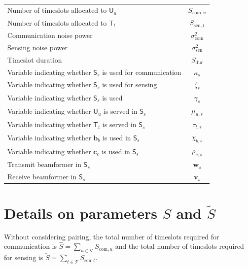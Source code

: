 \documentclass[10pt,journal,compsoc]{IEEEtran}
\theoremstyle{myremark}
\theoremstyle{myexample}
\begin{document}
\begin{appendices}
\begin{table}[H]
\begin{tabular}{|m{6.7cm} |c|}
		Number of timeslots allocated to $ \mathsf{U}_u $			& $ S_{\mathrm{com},u} $ \\
		Number of timeslots allocated to $ \mathsf{T}_t $			& $ S_{\mathrm{sen},t} $ \\
		Communication noise power 							& $ \sigma^2_\mathrm{com} $ \\ 
		Sensing noise power 								& $ \sigma^2_\mathrm{sen} $ \\ 
		Timeslot duration 								& $ S_\mathrm{dur} $ \\ 
		\hline
		Variable indicating whether $ \mathsf{S}_s $ is used for communication & $ \kappa_s $ \\
		Variable indicating whether $ \mathsf{S}_s $ is used for sensing & $ \zeta_s $ \\
		Variable indicating whether $ \mathsf{S}_s $ is used & $ \gamma_s $ \\
		Variable indicating whether $ \mathsf{U}_u $	is served in $ \mathsf{S}_s $ & $ \mu_{u,s} $ \\
		Variable indicating whether $ \mathsf{T}_t $	is served in $ \mathsf{S}_s $ & $ \tau_{t,s} $ \\
		Variable indicating whether $ \textbf{b}_b $ is used in $ \mathsf{S}_s $ & $ \chi_{b,s} $ \\
		Variable indicating whether $ \textbf{c}_c $ is used in $ \mathsf{S}_s $ & $ \rho_{c,s} $ \\
		Transmit beamformer in $ \mathsf{S}_s $			& $ \mathbf{w}_s $ \\
		Receive beamformer in $ \mathsf{S}_s $				& $ \mathbf{v}_s $ \\
		\hline
	\end{tabular}
	\label{tab:parameters-variables}
\end{table}



\setcounter{equation}{0}
\setcounter{table}{0}
\renewcommand{\theequation}{C.\arabic{equation}}
\section{Details on parameters $ S $ and $ \widetilde{S}$} \label{app:finite-horizon}

Without considering pairing, the total number of timeslots required for communication is $ \hat{S} = \sum_{u \in \mathcal{U}} S_{\mathrm{com},u} $ and the total number of timeslots required for sensing is $ \check{S} = \sum_{t \in \mathcal{T}} S_{\mathrm{sen},t} $. 


\end{appendices}
\end{document}
